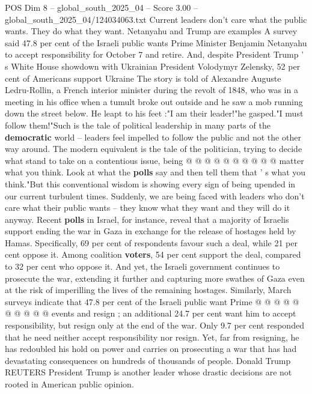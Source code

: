 \begin{textsample}{POS Dim 8 – global\_south\_2025\_04 – Score 3.00 – global\_south\_2025\_04/124034063.txt}  \label{ex:f8_pos_415}
Current leaders don't care what the public wants.
They do what they want.
Netanyahu and Trump are examples A survey said 47.8 per cent of the Israeli public wants Prime Minister Benjamin Netanyahu to accept responsibility for October 7 and retire.
And, despite President Trump ' s White House showdown with Ukrainian President Volodymyr Zelensky, 52 per cent of Americans support Ukraine The story is told of Alexandre Auguste Ledru-Rollin, a French interior minister during the revolt of 1848, who was in a meeting in his office when a tumult broke out outside and he saw a mob running down the street below.
He leapt to his feet :"I am their leader!"he gasped."I must follow them!"Such is the tale of political leadership in many parts of the \textbf{democratic} world -- leaders feel impelled to follow the public and not the other way around.
The modern equivalent is the tale of the politician, trying to decide what stand to take on a contentious issue, being @ @ @ @ @ @ @ @ @ @ matter what you think.
Look at what the \textbf{polls} say and then tell them that ' s what you think."But this conventional wisdom is showing every sign of being upended in our current turbulent times.
Suddenly, we are being faced with leaders who don't care what their public wants -- they know what they want and they will do it anyway.
Recent \textbf{polls} in Israel, for instance, reveal that a majority of Israelis support ending the war in Gaza in exchange for the release of hostages held by Hamas.
Specifically, 69 per cent of respondents favour such a deal, while 21 per cent oppose it.
Among coalition \textbf{voters}, 54 per cent support the deal, compared to 32 per cent who oppose it.
And yet, the Israeli government continues to prosecute the war, extending it further and capturing more swathes of Gaza even at the risk of imperilling the lives of the remaining hostages.
Similarly, March surveys indicate that 47.8 per cent of the Israeli public want Prime @ @ @ @ @ @ @ @ @ @ events and resign ; an additional 24.7 per cent want him to accept responsibility, but resign only at the end of the war.
Only 9.7 per cent responded that he need neither accept responsibility nor resign.
Yet, far from resigning, he has redoubled his hold on power and carries on prosecuting a war that has had devastating consequences on hundreds of thousands of people.
Donald Trump REUTERS President Trump is another leader whose drastic decisions are not rooted in American public opinion.

\end{textsample}
